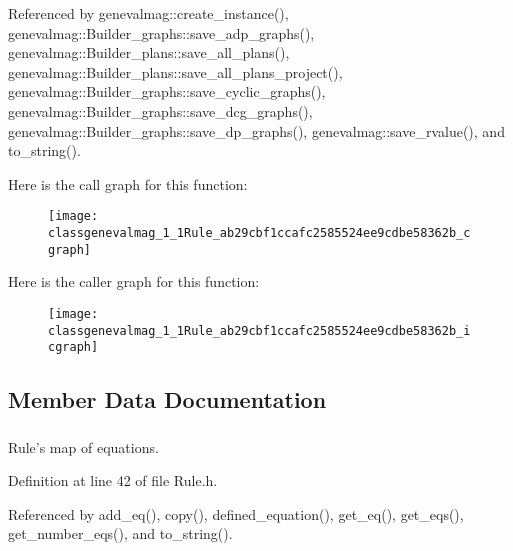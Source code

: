 Referenced by genevalmag::create\_\-instance(), genevalmag::Builder\_\-graphs::save\_\-adp\_\-graphs(), genevalmag::Builder\_\-plans::save\_\-all\_\-plans(), genevalmag::Builder\_\-plans::save\_\-all\_\-plans\_\-project(), genevalmag::Builder\_\-graphs::save\_\-cyclic\_\-graphs(), genevalmag::Builder\_\-graphs::save\_\-dcg\_\-graphs(), genevalmag::Builder\_\-graphs::save\_\-dp\_\-graphs(), genevalmag::save\_\-rvalue(), and to\_\-string().



Here is the call graph for this function:\nopagebreak
\begin{figure}[H]
\begin{center}
\leavevmode
\texttt{[image: classgenevalmag\_1\_1Rule\_ab29cbf1ccafc2585524ee9cdbe58362b\_cgraph]}
\end{center}
\end{figure}




Here is the caller graph for this function:\nopagebreak
\begin{figure}[H]
\begin{center}
\leavevmode
\texttt{[image: classgenevalmag\_1\_1Rule\_ab29cbf1ccafc2585524ee9cdbe58362b\_icgraph]}
\end{center}
\end{figure}




\subsection{Member Data Documentation}
\hypertarget{classgenevalmag_1_1Rule_aacf0a4aeb6ca8e955490731de96902d2}{
\subsubsection[{r\_\-eqs}]{}}
\label{classgenevalmag_1_1Rule_aacf0a4aeb6ca8e955490731de96902d2}


Rule's map of equations. 



Definition at line 42 of file Rule.h.



Referenced by add\_\-eq(), copy(), defined\_\-equation(), get\_\-eq(), get\_\-eqs(), get\_\-number\_\-eqs(), and to\_\-string().

